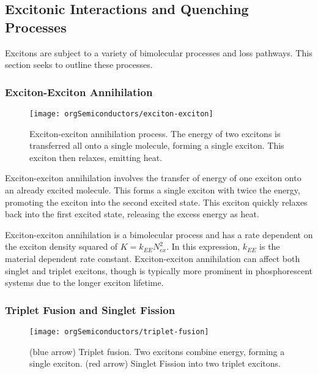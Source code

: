 \documentclass[../thesis.tex]{subfiles}
\begin{document}
\subsection{Excitonic Interactions and Quenching Processes}\label{sec:orgElec_quenching}

Excitons are subject to a variety of bimolecular processes and loss pathways.  
This section seeks to outline these processes.

\subsubsection{Exciton-Exciton Annihilation}

\begin{wrapfigure}{r}{.5\textwidth}
\centering
\texttt{[image: orgSemiconductors/exciton-exciton]}
\caption{Exciton-exciton annihilation process.  The energy of two excitons is transferred all onto a single molecule, forming a single exciton.  This exciton then relaxes, emitting heat.}
\label{fig:orgSemi_TT}
\end{wrapfigure}


Exciton-exciton annihilation involves the transfer of energy of one exciton onto an already excited molecule.  
This forms a single exciton with twice the energy, promoting the exciton into the second excited state.
This exciton quickly relaxes back into the first excited state, releasing the excess energy as heat.

Exciton-exciton annihilation is a bimolecular process and has a rate dependent on the exciton density squared of $K=k_{EE}N_{ex}^2$.\supercite{Reineke2007}
In this expression, $k_{EE}$ is the material dependent rate constant.
Exciton-exciton annihilation can affect both singlet and triplet excitons, though is typically more prominent in phosphorescent systems due to the longer exciton lifetime.


\subsubsection{Triplet Fusion and Singlet Fission}
\begin{wrapfigure}{r}{.5\textwidth}
\centering
\texttt{[image: orgSemiconductors/triplet-fusion]}
\caption{  (blue arrow) Triplet fusion.  Two excitons combine energy, forming a single exciton. (red arrow)  Singlet Fission into two triplet excitons.}
\label{fig:orgSemi_TF}
\end{wrapfigure}
\end{document}
